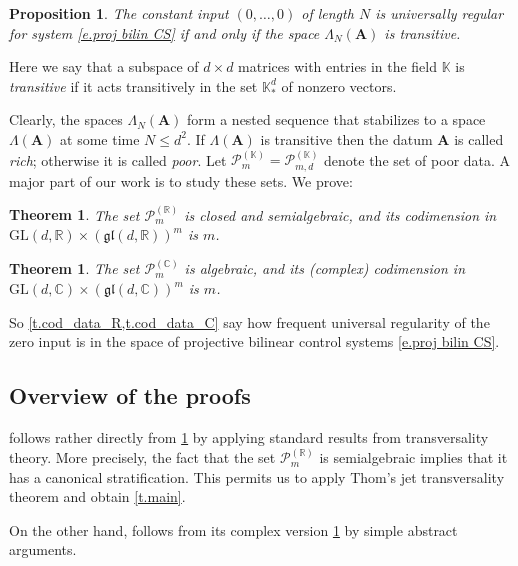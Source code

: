 \documentclass[10pt, a4paper]{amsart}
\theoremstyle{plain}
\newtheorem{thm}[lemma]{Theorem}
\newtheorem{prop}[lemma]{Proposition}
\theoremstyle{definition}
\theoremstyle{remark}
\theoremstyle{note}
\numberwithin{equation}{section}
\begin{document}
\begin{prop}\label{p.reg transitivity}
The constant input $(0,\dots,0)$ of length $N$ is universally regular 
for system \eqref{e.proj bilin CS}
if and only if the space $\Lambda_N({\mathbf{A}})$ is transitive.
\end{prop}

Here we say that a subspace of $d \times d$ matrices with entries in the field ${\mathbb{K}}$
is \emph{transitive} if it acts transitively in the set ${\mathbb{K}}^d_*$ of nonzero vectors.

Clearly, the spaces $\Lambda_N({\mathbf{A}})$ form a nested sequence that stabilizes 
to a space $\Lambda({\mathbf{A}})$ at some time $N \le d^2$.
If $\Lambda({\mathbf{A}})$ is transitive then the datum ${\mathbf{A}}$ is called \emph{rich}; 
otherwise it is called \emph{poor}.
Let ${\mathcal{P}}_m^{({\mathbb{K}})} = {\mathcal{P}}_{m,d}^{({\mathbb{K}})}$ denote the set of poor data.
A major part of our work is to study these sets.
We prove:

\begin{thm}\label{t.cod_data_R} 
The set ${\mathcal{P}}_{m}^{({\mathbb{R}})}$ is closed and semialgebraic,
and its codimension in ${\mathrm{GL}}(d,{\mathbb{R}}) \times ({\mathfrak{gl}}(d,{\mathbb{R}}))^m$
is $m$.
\end{thm}

\begin{thm}\label{t.cod_data_C} 
The set ${\mathcal{P}}_{m}^{({\mathbb{C}})}$ is algebraic,
and its (complex) codimension in ${\mathrm{GL}}(d,{\mathbb{C}}) \times ({\mathfrak{gl}}(d,{\mathbb{C}}))^m$
is $m$.
\end{thm}

So \cref{t.cod_data_R,t.cod_data_C} 
say how frequent universal regularity of the zero input is 
in the space of projective bilinear control systems \eqref{e.proj bilin CS}.

\subsection{Overview of the proofs}\label{ss.overview}

 follows rather directly from \cref{t.cod_data_R} 
by applying standard results from transversality theory.
More precisely, the fact that the set ${\mathcal{P}}_m^{({\mathbb{R}})}$ is semialgebraic
implies that it has a canonical stratification.
This permits us to apply Thom's jet transversality theorem and obtain \cref{t.main}.

On the other hand, 
follows from its complex version \cref{t.cod_data_C} 
by simple abstract arguments.
\end{document}
